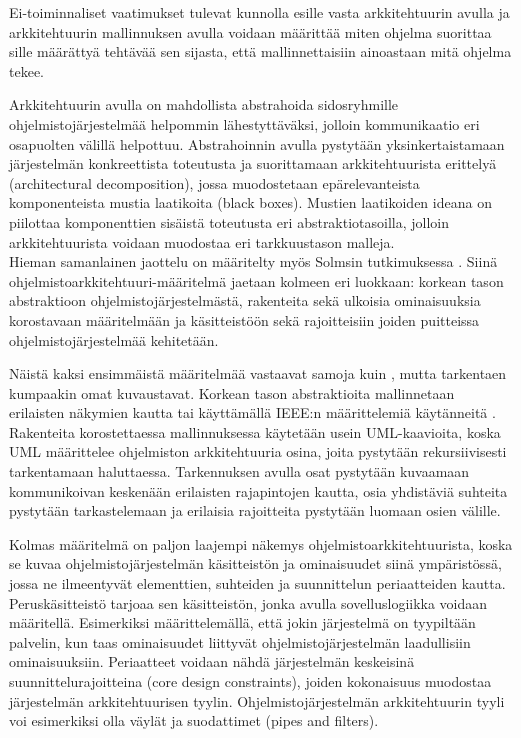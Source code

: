 \documentclass[finnish]{tktltiki2}
\theoremstyle{definition}
\theoremstyle{remark}
\begin{document}
Ei-toiminnaliset vaatimukset tulevat kunnolla esille vasta arkkitehtuurin avulla ja arkkitehtuurin mallinnuksen avulla voidaan määrittää miten ohjelma suorittaa sille määrättyä tehtävää sen sijasta, että mallinnettaisiin ainoastaan mitä ohjelma tekee. 

Arkkitehtuurin avulla on mahdollista abstrahoida
sidosryhmille ohjelmistojärjestelmää helpommin lähestyttäväksi, jolloin kommunikaatio eri osapuolten välillä helpottuu. Abstrahoinnin avulla pystytään yksinkertaistamaan järjestelmän konkreettista toteutusta ja suorittamaan arkkitehtuurista erittelyä (architectural decomposition), jossa muodostetaan epärelevanteista komponenteista mustia laatikoita (black boxes). Mustien laatikoiden ideana on piilottaa komponenttien sisäistä toteutusta eri abstraktiotasoilla, jolloin arkkitehtuurista voidaan muodostaa eri tarkkuustason malleja. 
\\

Hieman samanlainen jaottelu on määritelty myös Solmsin tutkimuksessa \citep[s. 368-369]{solms_what_2012}. Siinä ohjelmistoarkkitehtuuri-määritelmä jaetaan kolmeen eri luokkaan: korkean tason abstraktioon ohjelmistojärjestelmästä, rakenteita sekä ulkoisia ominaisuuksia korostavaan määritelmään ja käsitteistöön sekä rajoitteisiin joiden puitteissa ohjelmistojärjestelmää kehitetään. 

Näistä kaksi ensimmäistä määritelmää vastaavat samoja kuin \citep[s. 2-7]{gorton_understanding_2011}, mutta tarkentaen kumpaakin omat kuvaustavat. Korkean tason abstraktioita mallinnetaan erilaisten näkymien kautta tai käyttämällä IEEE:n määrittelemiä käytänneitä \citep[s. 4-5]{ieee_2000}. %
Rakenteita korostettaessa mallinnuksessa käytetään usein UML-kaavioita, koska UML määrittelee ohjelmiston arkkitehtuuria osina, joita pystytään rekursiivisesti tarkentamaan haluttaessa. Tarkennuksen avulla osat pystytään kuvaamaan kommunikoivan keskenään erilaisten rajapintojen kautta, osia yhdistäviä suhteita pystytään tarkastelemaan ja erilaisia rajoitteita pystytään luomaan osien välille. 

Kolmas määritelmä on paljon laajempi näkemys ohjelmistoarkkitehtuurista, koska se kuvaa ohjelmistojärjestelmän käsitteistön ja ominaisuudet siinä ympäristössä, jossa ne ilmeentyvät elementtien, suhteiden ja suunnittelun periaatteiden kautta. Peruskäsitteistö tarjoaa sen käsitteistön, jonka avulla sovelluslogiikka voidaan määritellä. Esimerkiksi määrittelemällä, että jokin järjestelmä on tyypiltään palvelin, kun taas ominaisuudet liittyvät ohjelmistojärjestelmän laadullisiin ominaisuuksiin. Periaatteet voidaan nähdä järjestelmän keskeisinä suunnittelurajoitteina (core design constraints), joiden kokonaisuus muodostaa järjestelmän arkkitehtuurisen tyylin. Ohjelmistojärjestelmän arkkitehtuurin tyyli voi esimerkiksi olla väylät ja suodattimet (pipes and filters). %
\\
\end{document}
